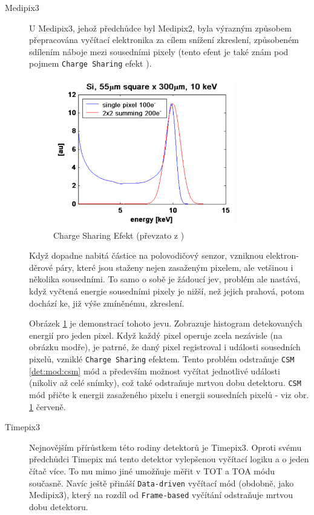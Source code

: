 \begin{description}
	\item[Medipix3] U Medipix3, jehož předchůdce byl Medipix2, byla výrazným způsobem přepracována vyčítací elektronika za cílem snížení zkreslení, způsobeném sdílením náboje mezi sousedními pixely (tento efent je také znám pod pojmem \texttt{Charge Sharing} efekt \cite{Jakubek-radiography_and_charge_sharing}). 

	\begin{figure}[th]
	\begin{center}
		\includegraphics[width=8cm]{figures/det_charge_sharing.png}
		\caption{Charge Sharing Efekt (převzato z \cite{medipix-www})}
		\label{fig:det:charge_sharing}
	\end{center}
	\end{figure}

	Když dopadne nabitá částice na polovodičový senzor, vzniknou elektron-děrové páry, které jsou staženy nejen zasaženým pixelem, ale vetšinou i několika sousedními. To samo o sobě je žádoucí jev, problém ale nastává, když vyčtená energie sousedními pixely je nižší, než jejich prahová, potom dochází ke, již výše zmíněnému, zkreslení. 
	
	Obrázek \ref{fig:det:charge_sharing} je demonstrací tohoto jevu. Zobrazuje histogram detekovaných energií pro jeden pixel. Když každý pixel operuje zcela nezávisle (na obrázku modře), je patrné, že daný pixel registroval i události sousedních pixelů, vzniklé \texttt{Charge Sharing} efektem. Tento problém odstraňuje \texttt{CSM} \ref{det:mod:csm} mód a především možnost vyčítat jednotlivé události (nikoliv až celé snímky), což také odstraňuje mrtvou dobu detektoru. \texttt{CSM} mód přičte k energii zasaženého pixelu i energii sousedních pixelů - viz obr. \ref{fig:det:charge_sharing} červeně.

	\item[Timepix3] Nejnovějším přírůstkem této rodiny detektorů je Timepix3. Oproti svému předchůdci Timepix má tento detektor vylepšenou vyčítací logiku a o jeden čítač více. To mu mimo jiné umožňuje měřit v TOT a TOA módu současně. Navíc ještě přináší \texttt{Data-driven} vyčítací mód (obdobně, jako Medipix3), který na rozdíl od \texttt{Frame-based} vyčítání odstraňuje mrtvou dobu detektoru.

\end{description}

